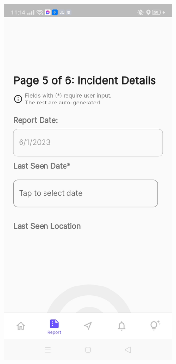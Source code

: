 \begin{figure}[!h]
\begin{subfigure}[c]{0.30\linewidth}
        \includegraphics[scale=0.15]{figures/Chapter4/Main/p5-1.jpg}
    \end{subfigure}
    \centering
    \begin{subfigure}[c]{0.30\linewidth}

\end{subfigure}
\end{figure}
